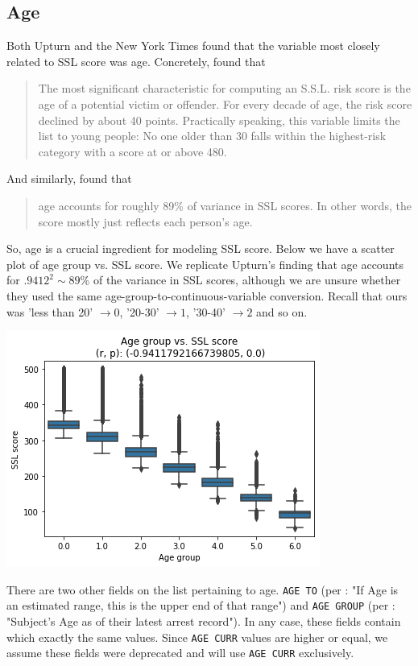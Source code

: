 \subsection{Age}
Both Upturn and the New York Times found that the variable most closely related to SSL score was age. Concretely, \cite{nyt} found that
\begin{quote}
The most significant characteristic for computing an S.S.L. risk score is the age of a potential victim or offender. For every decade of age, the risk score declined by about 40 points. Practically speaking, this variable limits the list to young people: No one older than 30 falls within the highest-risk category with a score at or above 480.
\end{quote}
And similarly, \cite{upturn} found that
\begin{quote}
    age accounts for roughly 89\% of variance in SSL scores. In other words, the score mostly just reflects each person’s age.
\end{quote}
So, age is a crucial ingredient for modeling SSL score. Below we have a scatter plot of age group vs. SSL score. We replicate Upturn's finding that age accounts for $.9412^2 \sim 89$\% of the variance in SSL scores, although we are unsure whether they used the same age-group-to-continuous-variable conversion. Recall that ours was 'less than 20' $\to 0$, '20-30' $\to 1$, '30-40' $\to 2$ and so on.
\begin{center}
    \includegraphics[scale=.7]{images/age_vs_ssl.png}
\end{center}
There are two other fields on the list pertaining to age. \texttt{AGE TO} (per \cite{data}: "If Age is an estimated range, this is the upper end of that range") and  \texttt{AGE GROUP} (per \cite{data}: "Subject's Age as of their latest arrest record"). In any case, these fields contain  which exactly the same values. Since \texttt{AGE CURR} values are higher or equal, we assume these fields were deprecated and will use \texttt{AGE CURR} exclusively.
